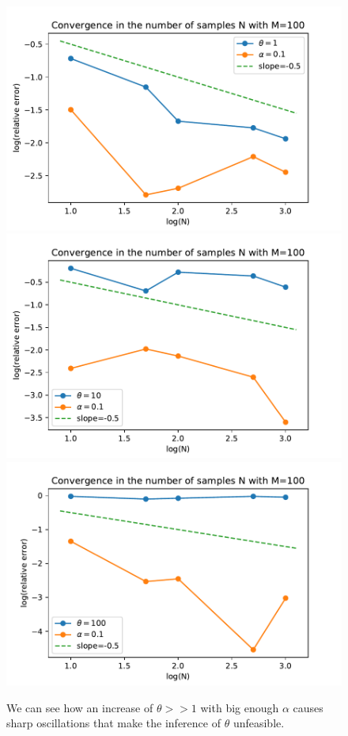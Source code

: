 \documentclass[aspectratio=169]{beamer}\usepackage[utf8]{inputenc}
\begin{document}
\begin{frame}
\begin{figure}
          \includegraphics[scale=0.22]{Figures/conv_N_moments_constant_fun_1_01.pdf}
    \includegraphics[scale=0.22]{Figures/conv_N_moments_constant_fun_10_01.pdf}
      \includegraphics[scale=0.22]{Figures/conv_N_moments_constant_fun_100_01.pdf}
      
  \caption{We can see how an increase of $\theta >>1$ with big enough $\alpha$ causes sharp oscillations that make the inference of  $\theta$ unfeasible.  }
\end{figure}
\end{frame}
\end{document}

